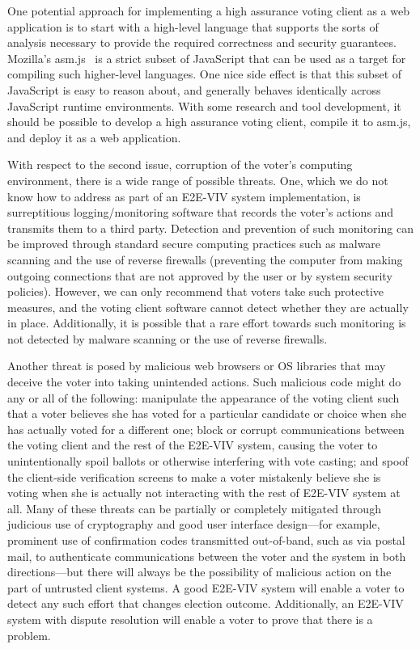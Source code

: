 One potential approach for implementing a high assurance voting client
as a web application is to start with a high-level language that
supports the sorts of analysis necessary to provide the required
correctness and security guarantees.  Mozilla's asm.js~\cite{asm.js}
is a strict subset of JavaScript that can be used as a target for
compiling such higher-level languages. One nice side effect is that
this subset of JavaScript is easy to reason about, and generally
behaves identically across JavaScript runtime environments. With some
research and tool development, it should be possible to develop a high
assurance voting client, compile it to asm.js, and deploy it as a web
application.

With respect to the second issue, corruption of the voter's computing
environment, there is a wide range of possible threats. One, which we
do not know how to address as part of an E2E-VIV system
implementation, is surreptitious logging/monitoring software that
records the voter's actions and transmits them to a third
party. Detection and prevention of such monitoring can be improved
through standard secure computing practices such as malware scanning
and the use of reverse firewalls (preventing the computer from making
outgoing connections that are not approved by the user or by system
security policies). However, we can only recommend that voters take
such protective measures, and the voting client software cannot detect
whether they are actually in place. Additionally, it is possible that
a rare effort towards such monitoring is not detected by malware
scanning or the use of reverse firewalls.

Another threat is posed by malicious web browsers or OS libraries that
may deceive the voter into taking unintended actions. Such malicious
code might do any or all of the following: manipulate the appearance
of the voting client such that a voter believes she has voted for a
particular candidate or choice when she has actually voted for a
different one; block or corrupt communications between the voting
client and the rest of the E2E-VIV system, causing the voter to
unintentionally spoil ballots or otherwise interfering with vote
casting; and spoof the client-side verification screens to make a
voter mistakenly believe she is voting when she is actually not
interacting with the rest of E2E-VIV system at all. Many of these
threats can be partially or completely mitigated through judicious use
of cryptography and good user interface design---for example,
prominent use of confirmation codes transmitted out-of-band, such as
via postal mail, to authenticate communications between the voter and
the system in both directions---but there will always be the
possibility of malicious action on the part of untrusted client
systems. A good E2E-VIV system will enable a voter to detect any such
effort that changes election outcome. Additionally, an E2E-VIV system
with dispute resolution will enable a voter to prove that there is a
problem.

